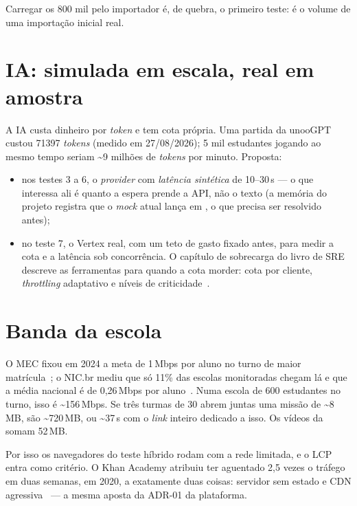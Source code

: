 \documentclass[11pt, a4paper, oneside, openany]{report}
\begin{document}
Carregar os 800 mil pelo importador é, de quebra, o primeiro teste: é o volume
de uma importação inicial real.

\section{IA: simulada em escala, real em amostra}

A IA custa dinheiro por \emph{token} e tem cota própria. Uma partida da
unooGPT custou \num{71397} \emph{tokens} (medido em 27/08/2026); 5 mil estudantes
jogando ao mesmo tempo seriam \textasciitilde9 milhões de \emph{tokens} por
minuto. Proposta:

\begin{itemize}
  \item nos testes 3 a 6, o \emph{provider}  com \emph{latência
    sintética} de 10--30\,s --- o que interessa ali é quanto a espera prende a
    API, não o texto (a memória do projeto registra que o \emph{mock} atual
    lança em , o que precisa ser resolvido antes);
  \item no teste 7, o Vertex real, com um teto de gasto fixado antes, para
    medir a cota e a latência sob concorrência. O capítulo de sobrecarga do
    livro de SRE descreve as ferramentas para quando a cota morder: cota por
    cliente, \emph{throttling} adaptativo e níveis de
    criticidade~\cite{sreoverload}.
\end{itemize}

\section{Banda da escola}
\label{sec:banda}

O MEC fixou em 2024 a meta de 1\,Mbps por aluno no turno de maior
matrícula~\cite{enec2024}; o NIC.br mediu que só 11\% das escolas monitoradas
chegam lá e que a média nacional é de 0,26\,Mbps por aluno~\cite{nicbr2024}.
Numa escola de 600 estudantes no turno, isso é \textasciitilde156\,Mbps. Se três
turmas de 30 abrem juntas uma missão de \textasciitilde8\,MB, são
\textasciitilde720\,MB, ou \textasciitilde37\,s com o \emph{link} inteiro
dedicado a isso. Os vídeos da  somam 52\,MB.

Por isso os navegadores do teste híbrido rodam com a rede limitada, e o LCP
entra como critério. O Khan Academy atribuiu ter aguentado 2,5 vezes o tráfego
em duas semanas, em 2020, a exatamente duas coisas: servidor sem estado e CDN
agressiva~\cite{kosarchyn2020} --- a mesma aposta da ADR-01 da plataforma.
\end{document}
